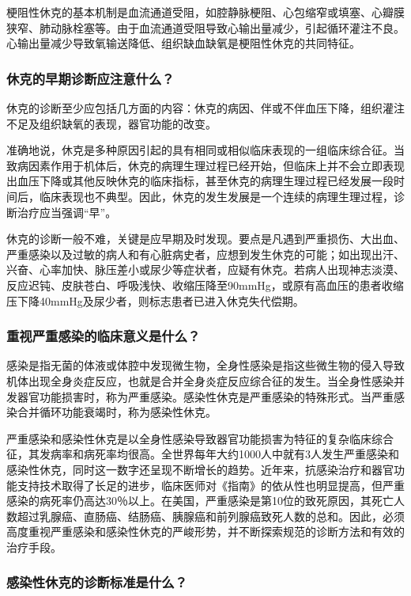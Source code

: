梗阻性休克的基本机制是血流通道受阻，如腔静脉梗阻、心包缩窄或填塞、心瓣膜狭窄、肺动脉栓塞等。由于血流通道受阻导致心输出量减少，引起循环灌注不良。心输出量减少导致氧输送降低、组织缺血缺氧是梗阻性休克的共同特征。

\subsubsection{休克的早期诊断应注意什么？}

休克的诊断至少应包括几方面的内容：休克的病因、伴或不伴血压下降，组织灌注不足及组织缺氧的表现，器官功能的改变。

准确地说，休克是多种原因引起的具有相同或相似临床表现的一组临床综合征。当致病因素作用于机体后，休克的病理生理过程已经开始，但临床上并不会立即表现出血压下降或其他反映休克的临床指标，甚至休克的病理生理过程已经发展一段时间后，临床表现也不典型。因此，休克的发生发展是一个连续的病理生理过程，诊断治疗应当强调“早”。

休克的诊断一般不难，关键是应早期及时发现。要点是凡遇到严重损伤、大出血、严重感染以及过敏的病人和有心脏病史者，应想到发生休克的可能；如出现出汗、兴奋、心率加快、脉压差小或尿少等症状者，应疑有休克。若病人出现神志淡漠、反应迟钝、皮肤苍白、呼吸浅快、收缩压降至90mmHg，或原有高血压的患者收缩压下降40mmHg及尿少者，则标志患者已进入休克失代偿期。

\subsubsection{重视严重感染的临床意义是什么？}

感染是指无菌的体液或体腔中发现微生物，全身性感染是指这些微生物的侵入导致机体出现全身炎症反应，也就是合并全身炎症反应综合征的发生。当全身性感染并发器官功能损害时，称为严重感染。感染性休克是严重感染的特殊形式。当严重感染合并循环功能衰竭时，称为感染性休克。

严重感染和感染性休克是以全身性感染导致器官功能损害为特征的复杂临床综合征，其发病率和病死率均很高。全世界每年大约1000人中就有3人发生严重感染和感染性休克，同时这一数字还呈现不断增长的趋势。近年来，抗感染治疗和器官功能支持技术取得了长足的进步，临床医师对《指南》的依从性也明显提高，但严重感染的病死率仍高达30％以上。在美国，严重感染是第10位的致死原因，其死亡人数超过乳腺癌、直肠癌、结肠癌、胰腺癌和前列腺癌致死人数的总和。因此，必须高度重视严重感染和感染性休克的严峻形势，并不断探索规范的诊断方法和有效的治疗手段。

\subsubsection{感染性休克的诊断标准是什么？}

